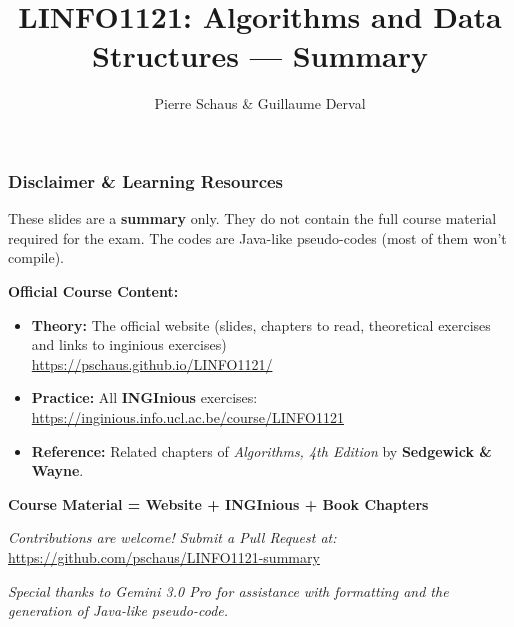 \documentclass[8pt,aspectratio=169]{beamer}
\begin{document}
	\author{Pierre Schaus \& Guillaume Derval}
	\title{LINFO1121: Algorithms and Data Structures — Summary}

	\begin{frame}[plain]
	\maketitle
	\end{frame}

\begin{frame}[t]
\frametitle{Disclaimer \& Learning Resources}

\begin{alertblock}{}
These slides are a \textbf{summary} only. They do not contain the full course material required for the exam.
The codes are Java-like pseudo-codes (most of them won't compile).
\end{alertblock}

\vspace{0.3cm}
\textbf{Official Course Content:}
\begin{itemize}
    \item \textbf{Theory:} The official website (slides, chapters to read, theoretical exercises and links to inginious exercises)\\ 
    \small \url{https://pschaus.github.io/LINFO1121/}
    \item \textbf{Practice:} All \textbf{INGInious} exercises:\\
    \small \url{https://inginious.info.ucl.ac.be/course/LINFO1121}
    \item \textbf{Reference:} Related chapters of \textit{Algorithms, 4th Edition} by \textbf{Sedgewick \& Wayne}.
\end{itemize}

\vspace{0.4cm}
\begin{center}
    \color{red} \textbf{Course Material = Website + INGInious + Book Chapters}
\end{center}

\vspace{0.2cm}
\footnotesize \textit{Contributions are welcome! Submit a Pull Request at:} \\
\url{https://github.com/pschaus/LINFO1121-summary}

\vspace{0.3cm}
\footnotesize 
\textit{Special thanks to Gemini 3.0 Pro for assistance with formatting and the generation of Java-like pseudo-code.}
\vspace{0.1cm}

\end{frame}
\end{document}
